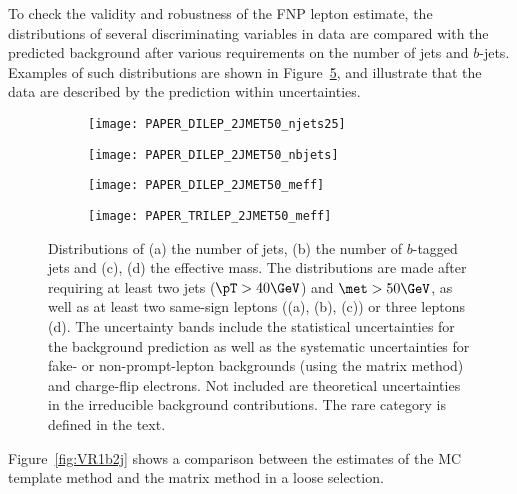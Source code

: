To check the validity and robustness of the FNP lepton estimate, 
the distributions of several discriminating variables in data are compared 
with the predicted background after various requirements on the number of jets and $b$-jets. 
Examples of such distributions are shown in Figure~\ref{fig:Bkg_distribs}, 
and illustrate that the data are described by the prediction within 
uncertainties. 

\begin{figure}[th!]
\centering
\begin{subfigure}[t]{0.49\textwidth}\texttt{[image: PAPER\_DILEP\_2JMET50\_njets25]}\caption{}\label{fig:VRnj}\end{subfigure}
\begin{subfigure}[t]{0.49\textwidth}\texttt{[image: PAPER\_DILEP\_2JMET50\_nbjets]}\caption{}\label{fig:VRnb}\end{subfigure}
\begin{subfigure}[t]{0.49\textwidth}\texttt{[image: PAPER\_DILEP\_2JMET50\_meff]}\caption{}\label{fig:VRmeff1}\end{subfigure}
\begin{subfigure}[t]{0.49\textwidth}\texttt{[image: PAPER\_TRILEP\_2JMET50\_meff]}\caption{}\label{fig:VRmeff2}\end{subfigure}
\caption{
Distributions of (a) the number of jets, (b) the number of $b$-tagged jets and (c), (d) the effective mass. The distributions are made 
after requiring at least two jets ($\pT>40 \GeV$) and $\met>50 \GeV$, as well as at least two same-sign leptons ((a), (b), (c)) 
or three leptons (d). The uncertainty bands include the statistical uncertainties for the background prediction as well as the 
systematic uncertainties for fake- or non-prompt-lepton backgrounds (using the matrix method) and charge-flip electrons. Not included
are theoretical uncertainties in the irreducible background contributions.
The rare category is defined in the text.}
\label{fig:Bkg_distribs} 
\end{figure} 

Figure~\ref{fig:VR1b2j} shows a comparison between the estimates of the 
MC template method and the matrix method in a loose selection.

